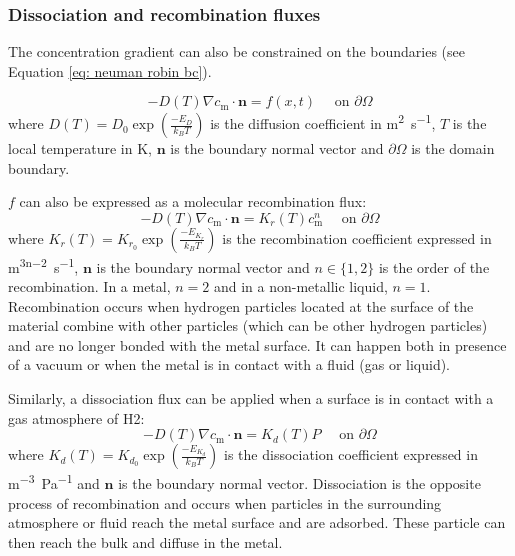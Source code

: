 \subsubsection{Dissociation and recombination fluxes}

The concentration gradient can also be constrained on the boundaries (see Equation \ref{eq: neuman robin bc}).

\begin{equation}
    - D(T)\nabla c_\mathrm{m} \cdot \mathbf{n} = f(x, t) \quad \text { on } \partial \Omega
    \label{eq: neuman robin bc}
\end{equation}
where $D(T) = D_0 \exp(\frac{-E_D}{k_B T}) $ is the diffusion coefficient in \si{m^2.s^{-1}}, $T$ is the local temperature in \si{K}, $\mathbf{n}$ is the boundary normal vector and $\partial \Omega$ is the domain boundary.

$f$ can also be expressed as a molecular recombination flux:
\begin{equation}
    - D(T)\nabla c_\mathrm{m} \cdot \mathbf{n} = K_r(T) c_\mathrm{m}^n \quad \text { on } \partial \Omega
    \label{eq: recombination flux}
\end{equation}
where $K_r(T) = K_{r_0} \exp(\frac{-E_{K_r}}{k_B T}) $ is the recombination coefficient expressed in \si{m^{3n-2}.s^{-1}}, $\mathbf{n}$ is the boundary normal vector and $n \in \{1, 2\}$ is the order of the recombination.
In a metal, $n=2$ and in a non-metallic liquid, $n=1$.
Recombination occurs when hydrogen particles located at the surface of the material combine with other particles (which can be other hydrogen particles) and are no longer bonded with the metal surface.
It can happen both in presence of a vacuum or when the metal is in contact with a fluid (gas or liquid).

Similarly, a dissociation flux can be applied when a surface is in contact with a gas atmosphere of H2:
\begin{equation}
    - D(T)\nabla c_\mathrm{m} \cdot \mathbf{n} = K_d(T) P \quad \text { on } \partial \Omega
    \label{eq: dissociation flux}
\end{equation}
where $K_d(T) = K_{d_0} \exp(\frac{-E_{K_d}}{k_B T}) $ is the dissociation coefficient expressed in \si{m^{-3}.Pa^{-1}} and $\mathbf{n}$ is the boundary normal vector.
Dissociation is the opposite process of recombination and occurs when particles in the surrounding atmosphere or fluid reach the metal surface and are adsorbed.
These particle can then reach the bulk and diffuse in the metal.

